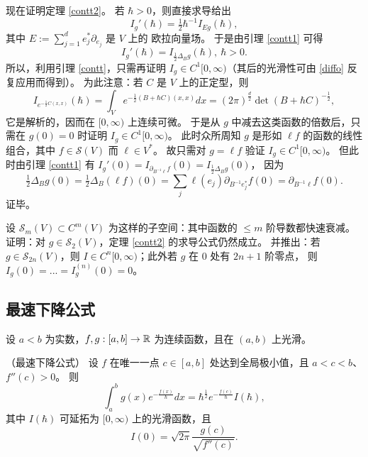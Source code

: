 现在证明定理 \ref{contt2}。
若 $\hbar>0$，则直接求导给出
$$
I_g'(\hbar)=\tfrac{1}{2}\hbar^{-1}I_{Eg}(\hbar),
$$
其中 $E:=\sum_{j=1}^d e_j^*\partial_{e_j}$ 是 $V$ 上的 欧拉向量场。
于是由引理 \ref{contt1} 可得
\begin{equation}\label{diffo}
I_g'(\hbar)=I_{\tfrac{1}{2}\Delta_B g}(\hbar),\ \hbar>0.
\end{equation} 
所以，利用引理 \ref{contt}，只需再证明 $I_g\in C^1[0,\infty)$（其后的光滑性可由 \eqref{diffo}
反复应用而得到）。
为此注意：若 $C$ 是 $V$ 上的正定型，则
$$
I_{e^{-\frac{1}{2}C(x,x)}}(\hbar)=\int_{V}e^{-\frac{1}{2}(B+\hbar C)(x,x)}dx=
(2\pi)^{\frac{d}{2}}\det (B+\hbar C)^{-\frac{1}{2}},
$$
它是解析的，因而在 $[0,\infty)$ 上连续可微。
于是从 $g$ 中减去这类函数的倍数后，只需在 $g(0)=0$ 时证明 $I_g\in C^1[0,\infty)$。
此时众所周知 $g$ 是形如 $\ell f$ 的函数的线性组合，其中 $f\in \mathcal S(V)$ 而 $\ell\in V^*$。
故只需对 $g=\ell f$ 验证 $I_g\in C^1[0,\infty)$。
但此时由引理 \ref{contt1} 有
$I_g'(0)=I_{\partial_{B^{-1}\ell}f}(0)=I_{\frac{1}{2}\Delta_Bg}(0)$，
因为
$$
\tfrac{1}{2}\Delta_Bg(0)=\tfrac{1}{2}\Delta_B(\ell f)(0)=\sum_j \ell(e_j)
\partial_{B^{-1}e_j^*}f(0)=\partial_{B^{-1}\ell}f(0).
$$
证毕。

\begin{exercise}\label{gencontt2} 设 $\mathcal S_m(V)\subset C^m(V)$ 为这样的子空间：其中函数的
$\le m$ 阶导数都快速衰减。证明：对 $g\in \mathcal S_2(V)$，定理 \ref{contt2} 的求导公式仍然成立。
并推出：若 $g\in \mathcal S_{2n}(V)$，则 $I\in C^n[0,\infty)$；此外若 $g$ 在 $0$ 处有 $2n+1$ 阶零点，
则 $I_g(0)=...=I_g^{(n)}(0)=0$。
\end{exercise} 

\subsection{最速下降公式}
设 $a<b$ 为实数，$f,g: [a,b]\to \Bbb R$ 为连续函数，且在 $(a,b)$ 上光滑。

\begin{theorem}\label{statphase1}（最速下降公式）
设 $f$ 在唯一一点 $c\in [a,b]$ 处达到全局极小值，且 $a<c<b$、$f''(c)>0$。
则
\begin{equation}\label{inte}
\int_a^bg(x)e^{-\frac{f(x)}{\hbar}}dx=\hbar^{\frac{1}{2}}e^{-\frac{f(c)}{\hbar}}I(\hbar),
\end{equation}
其中 $I(\hbar)$ 可延拓为 $[0,\infty)$ 上的光滑函数，且 $$I(0)=\sqrt{2\pi}\frac{g(c)}{\sqrt{f''(c)}}.$$ 
\end{theorem} 


